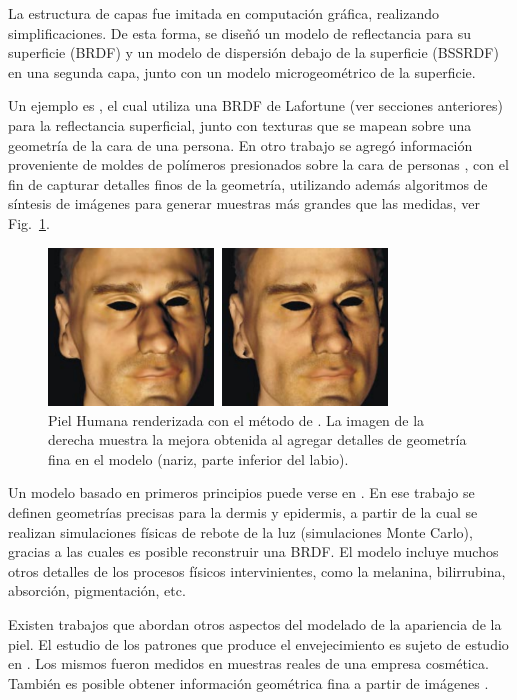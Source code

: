 La estructura de capas fue imitada en computación gráfica, realizando simplificaciones.
De esta forma, se diseñó un modelo de reflectancia para su superficie (BRDF) y un modelo de dispersión debajo de la superficie (BSSRDF) en una segunda capa, junto con un modelo microgeométrico de la superficie.

Un ejemplo es \cite{Marschner2000}, el cual utiliza una BRDF de Lafortune (ver secciones anteriores) para la reflectancia superficial, junto con texturas que se mapean sobre una geometría de la cara de una persona.
En otro trabajo se agregó información proveniente de moldes de polímeros presionados sobre la cara de personas \cite{Haro2001}, con el fin de capturar detalles finos de la geometría, utilizando además algoritmos de síntesis de imágenes para generar muestras más grandes que las medidas, ver Fig.~\ref{fg:piel}.

\begin{figure}
\center
\includegraphics[width=9cm]{figures/piel}
\caption[Piel Humana renderizada]{Piel Humana renderizada con el método de \cite{Marschner2000}. La imagen de la derecha muestra la mejora obtenida al agregar detalles de geometría fina en el modelo (nariz, parte inferior del labio).}
\label{fg:piel}
\end{figure}

Un modelo basado en primeros principios puede verse en \cite{Krishnaswamy2004}.
En ese trabajo se definen geometrías precisas para la dermis y epidermis, a partir de la cual se realizan simulaciones físicas de rebote de la luz (simulaciones Monte Carlo), gracias a las cuales es posible reconstruir una BRDF.
El modelo incluye muchos otros detalles de los procesos físicos intervinientes, como la melanina, bilirrubina, absorción, pigmentación, etc.

Existen trabajos que abordan otros aspectos del modelado de la apariencia de la piel.
El estudio de los patrones que produce el envejecimiento es sujeto de estudio en \cite{Boissieux2000}.
Los mismos fueron medidos en muestras reales de una empresa cosmética.
También es posible obtener información geométrica fina a partir de imágenes \cite{Golovinskiy2006}.

